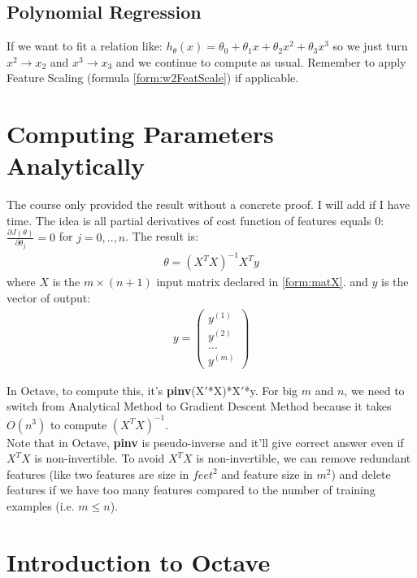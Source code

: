 \subsection{Polynomial Regression}
If we want to fit a relation like: $h_\theta(x) = \theta_0 + \theta_1 x + \theta_2 x^2 + \theta_3 x^3 $ so we just turn $x^2 \rightarrow x_2$ and $x^3 \rightarrow x_3$ and we continue to compute as usual. Remember to apply Feature Scaling (formula \eqref{form:w2FeatScale}) if applicable.

\section{Computing Parameters Analytically}
The course only provided the result without a concrete proof. I will add if I have time. The idea is all partial derivatives of cost function of features equals 0: $\frac{\partial J(\theta)}{\partial \theta_j} = 0$ for $j=0,..,n$. The result is:
\begin{align} \label{form:paraAna}
\theta = (X^T X)^{-1}X^Ty
\end{align}
where $X$ is the $m \times (n+1)$ input matrix declared in \eqref{form:matX}.
and $y$ is the vector of output:
\begin{align}
y = \begin{pmatrix} \label{form:matY}
y^{(1)} \\
y^{(2)} \\
... \\
y^{(m)}
\end{pmatrix}
\end{align}

In Octave, to compute this, it's \textbf{pinv}(X$'$*X)*X$'$*y. For big $m$ and $n$, we need to switch from Analytical Method to Gradient Descent Method because it takes $O(n^3)$ to compute $(X^TX)^{-1}$. \\
Note that in Octave, \textbf{pinv} is pseudo-inverse and it'll give correct answer even if $X^TX$ is non-invertible. To avoid $X^TX$ is non-invertible, we can remove redundant features (like two features are size in $feet^2$ and feature size in $m^2$) and delete features if we have too many features compared to the number of training examples (i.e. $m \leq n$). 

\section{Introduction to Octave}
